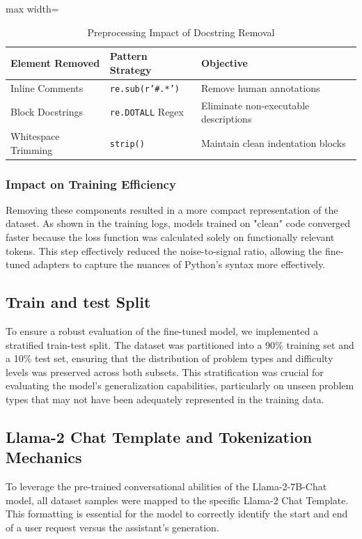 \begin{table}[H]
    \centering
    \caption{Preprocessing Impact of Docstring Removal}
    \label{tab:comment_removal}
    \begin{adjustbox}{max width=\textwidth}
    \begin{tabular}{lll}
        \toprule
        \textbf{Element Removed} & \textbf{Pattern Strategy} & \textbf{Objective} \\
        \midrule
        Inline Comments & \texttt{re.sub(r'\#.*')} & Remove human annotations \\
        Block Docstrings & \texttt{re.DOTALL} Regex & Eliminate non-executable descriptions \\
        Whitespace Trimming & \texttt{strip()} & Maintain clean indentation blocks \\
        \bottomrule
    \end{tabular}
    \end{adjustbox}
\end{table}

\subsubsection{Impact on Training Efficiency}
Removing these components resulted in a more compact representation of the dataset. As shown in the training logs, models trained on "clean" code converged faster because the loss function was calculated solely on functionally relevant tokens. This step effectively reduced the noise-to-signal ratio, allowing the fine-tuned adapters to capture the nuances of Python's syntax more effectively.

\subsection{Train and test Split}
To ensure a robust evaluation of the fine-tuned model, we implemented a stratified train-test split. The dataset was partitioned into a 90\% training set and a 10\% test set, ensuring that the distribution of problem types and difficulty levels was preserved across both subsets. This stratification was crucial for evaluating the model's generalization capabilities, particularly on unseen problem types that may not have been adequately represented in the training data.

\subsection{Llama-2 Chat Template and Tokenization Mechanics}
To leverage the pre-trained conversational abilities of the Llama-2-7B-Chat model, all dataset samples were mapped to the specific Llama-2 Chat Template. This formatting is essential for the model to correctly identify the start and end of a user request versus the assistant's generation.



